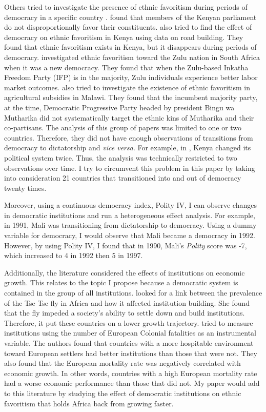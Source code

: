 \documentclass{wptemp}
\begin{document}
Others tried to investigate the presence of ethnic favoritism during periods of democracy in a specific country \citep{burgess2015value, dionne2016political, harris2019under, kramon2016ethnic}. \citet{harris2019under} found that members of the Kenyan parliament do not disproportionally favor their constituents. \citet{burgess2015value} also tried to find the effect of democracy on ethnic favoritism in Kenya using data on road building. They found that ethnic favoritism exists in Kenya, but it disappears during periods of democracy. \citet{amodio2016ethnic} investigated ethnic favoritism toward the Zulu nation in South Africa when it was a new democracy. They found that when the Zulu-based Inkatha Freedom Party (IFP) is in the majority, Zulu individuals experience better labor market outcomes. \citet{dionne2016political} also tried to investigate the existence of ethnic favoritism in agricultural subsidies in Malawi. They found that the incumbent majority party, at the time, Democratic Progressive Party headed by president Bingu wa Mutharika did not systematically target the ethnic kins of Mutharika and their co-partisans. The analysis of this group of papers was limited to one or two countries. Therefore, they did not have enough observations of transitions from democracy to dictatorship and \textit{vice versa}. For example, in \citet{burgess2015value}, Kenya changed its political system twice. Thus, the analysis was technically restricted to two observations over time. I try to circumvent this problem in this paper by taking into consideration 21 countries that transitioned into and out of democracy twenty times.

Moreover, using a continuous democracy index, Polity IV, I can observe changes in democratic institutions and run a heterogeneous effect analysis. For example, in 1991, Mali was transitioning from dictatorship to democracy. Using a dummy variable for democracy, I would observe that Mali became a democracy in 1992. However, by using Polity IV, I found that in 1990, Mali's \textit{Polity} score was -7, which increased to 4 in 1992 then 5 in 1997. 

Additionally, the literature considered the effects of institutions on economic growth. This relates to the topic I propose because a democratic system is contained in the group of all institutions. \citet{alsan2015effect} looked for a link between the prevalence of the Tse Tse fly in Africa and how it affected institution building. She found that the fly impeded a society's ability to settle down and build institutions. Therefore, it put these countries on a lower growth trajectory. \citet{acemoglu2001colonial} tried to measure institutions using the number of European Colonial fatalities as an instrumental variable. The authors found that countries with a  more hospitable environment toward European settlers had better institutions than those that were not. They also found that the European mortality rate was negatively correlated with economic growth. In other words, countries with a high European mortality rate had a worse economic performance than those that did not. My paper would add to this literature by studying the effect of democratic institutions on ethnic favoritism that holds Africa back from growing faster. 
\end{document}
